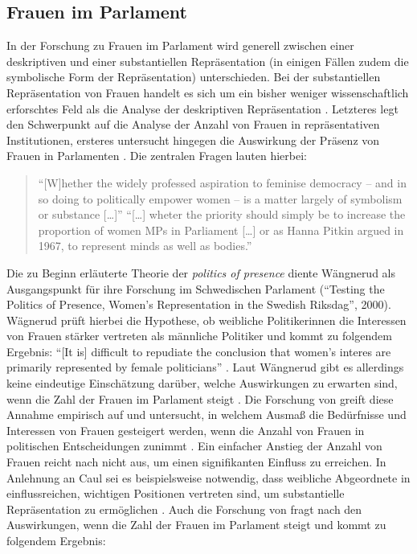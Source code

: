 \documentclass[12pt, 
    twoside=false, 
    bibliography=totoc, 
    numbers=endperiod, 
    headings=normal, 
    toc=chapterentrydotfill
    ]{scrbook}
\begin{document}
\subsection{Frauen im Parlament}

In der Forschung zu Frauen im Parlament wird generell zwischen einer deskriptiven und einer substantiellen Repräsentation (in einigen Fällen zudem die symbolische Form der Repräsentation) unterschieden. Bei der substantiellen Repräsentation von Frauen handelt es sich um ein bisher weniger wissenschaftlich erforschtes Feld als die Analyse der deskriptiven Repräsentation \parencite[59]{wangnerud_2009}. 
Letzteres legt den Schwerpunkt auf die Analyse der Anzahl von Frauen in repräsentativen Institutionen, ersteres untersucht hingegen die Auswirkung der Präsenz von Frauen in Parlamenten \parencites[14]{coffe_2013}[52]{wangnerud_2009}.
Die zentralen Fragen lauten hierbei:

\begin{quote}
  \enquote{[W]hether the widely professed aspiration to feminise democracy -- and in so doing to politically empower women -- is a matter largely of symbolism or substance […]}
  \enquote{[…] wheter the priority should simply be to increase the proportion of women MPs in Parliament […] or as Hanna Pitkin argued in 1967, to represent minds as well as bodies.}
  \parencite[413]{blaxill_2016}
\end{quote}

%
Die zu Beginn erläuterte Theorie der \emph{politics of presence} \parencite{phillips_1998} diente Wängnerud \parencite*{wangnerud_2000} als Ausgangspunkt für ihre Forschung im Schwedischen Parlament (\enquote{Testing the Politics of Presence, Women's Representation in the Swedish Riksdag}, 2000). Wägnerud prüft hierbei die Hypothese, ob weibliche Politikerinnen die Interessen von Frauen stärker vertreten als männliche Politiker \parencite[84]{wangnerud_2000} und kommt zu folgendem Ergebnis: \enquote{[It is] difficult to repudiate the conclusion that women's interes are primarily represented by female politicians} \parencite[][84]{wangnerud_2000}. Laut Wängnerud \parencite*{wangnerud_2000} gibt es allerdings keine eindeutige Einschätzung darüber, welche Auswirkungen zu erwarten sind, wenn die Zahl der Frauen im Parlament steigt \parencite{wangnerud_2009}.
Die Forschung von \textcite{celis_2008} greift diese Annahme empirisch auf und untersucht, in welchem Ausmaß die Bedürfnisse und Interessen von Frauen gesteigert werden, wenn die Anzahl von Frauen in politischen Entscheidungen zunimmt \parencite[vgl. auch][4]{galligan_2016}. Ein einfacher Anstieg der Anzahl von Frauen reicht nach \textcite{celis_2008}  nicht aus, um einen signifikanten Einfluss zu erreichen. In Anlehnung an Caul \parencite*{caul_2001}  sei  es beispielsweise notwendig, dass weibliche Abgeordnete in einflussreichen, wichtigen Positionen vertreten sind, um substantielle Repräsentation zu ermöglichen \parencites{caul_2001}[vgl. auch][14]{coffe_2013}.
Auch die Forschung von \textcite{back_2014} fragt nach den Auswirkungen, wenn die Zahl der Frauen im Parlament steigt und kommt zu folgendem Ergebnis: 
\end{document}
